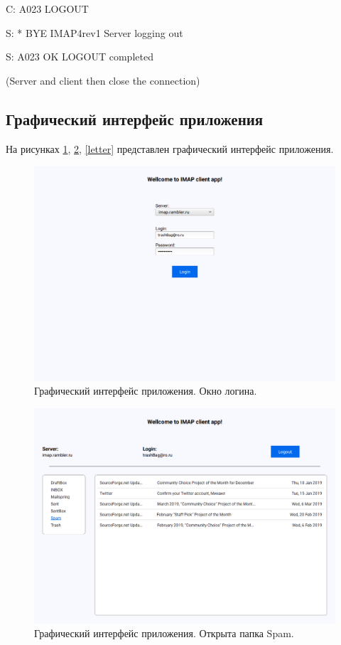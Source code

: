 \documentclass[a4paper,14pt]{extarticle}
\begin{document}
        C: A023 LOGOUT

        S: * BYE IMAP4rev1 Server logging out

        S: A023 OK LOGOUT completed

        (Server and client then close the connection)


\subsection{Графический интерфейс приложения}

    На рисунках \ref{login}, \ref{spam}, \ref{letter} представлен графический интерфейс приложения.

    \begin{figure}[H]
        \begin{center}
            \includegraphics[scale=0.25]{pics/login}
            \caption{Графический интерфейс приложения. Окно логина.}
            \label{login}
        \end{center}
    \end{figure}

    \begin{figure}[H]
        \begin{center}
            \includegraphics[scale=0.4]{pics/spam}
            \caption{Графический интерфейс приложения. Открыта папка Spam.}
            \label{spam}
        \end{center}
    \end{figure}
\end{document}
